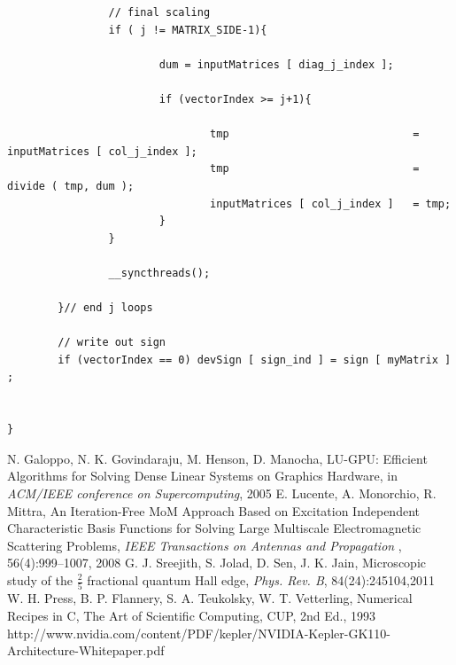 \documentclass[letter, 12pt]{article}
\begin{document}
\begin{verbatim}
                // final scaling
                if ( j != MATRIX_SIDE-1){

                        dum = inputMatrices [ diag_j_index ];

                        if (vectorIndex >= j+1){

                                tmp                             = inputMatrices [ col_j_index ];
                                tmp                             = divide ( tmp, dum );
                                inputMatrices [ col_j_index ]   = tmp;
                        }
                }

                __syncthreads();

        }// end j loops

        // write out sign
        if (vectorIndex == 0) devSign [ sign_ind ] = sign [ myMatrix ] ;


}
\end{verbatim}
\endgroup
\begin{thebibliography}{30}
N. Galoppo, N. K. Govindaraju, M. Henson, D. Manocha, LU-GPU: Efficient Algorithms for Solving Dense Linear Systems on Graphics Hardware, 
in {\it ACM/IEEE conference on Supercomputing}, 2005
E. Lucente, A. Monorchio, R. Mittra, An Iteration-Free MoM Approach Based on Excitation Independent Characteristic Basis Functions for Solving Large Multiscale Electromagnetic Scattering Problems, {\it IEEE Transactions on Antennas and Propagation} , 56(4):999--1007, 2008
 G. J. Sreejith, S. Jolad, D. Sen, J. K. Jain, Microscopic study of the $\frac{2}{5}$ fractional quantum Hall edge, {\it Phys. Rev. B}, 84(24):245104,2011
 W. H. Press, B. P. Flannery, S. A. Teukolsky, W. T. Vetterling, Numerical Recipes in C, The Art of Scientific Computing, CUP, 2nd Ed., 1993
 http://www.nvidia.com/content/PDF/kepler/NVIDIA-Kepler-GK110-Architecture-Whitepaper.pdf

\end{thebibliography}
\end{document}
